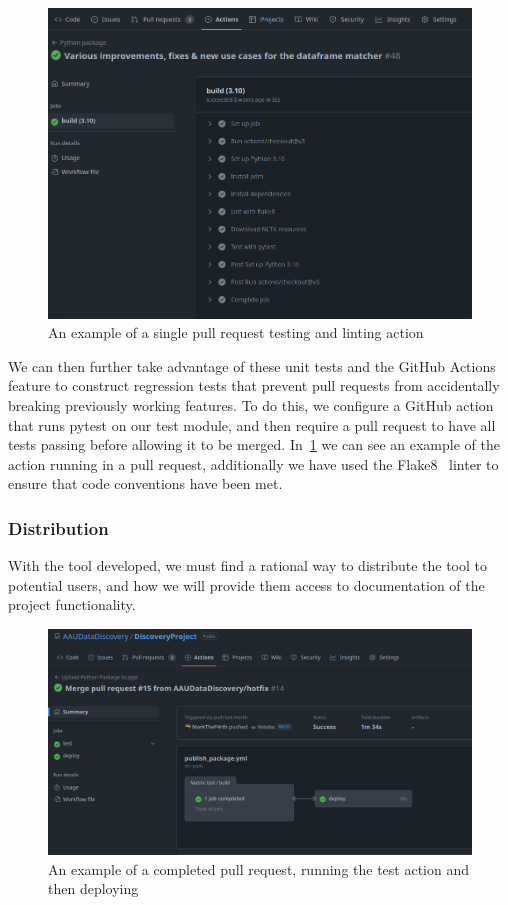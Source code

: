 \begin{figure}[H]
    \centering
    \includegraphics[width=12cm]{figures/discovery_library/test_and_lint_github_action}
    \caption{An example of a single pull request testing and linting action}
    \label{fig:discovery_unit_test}
\end{figure}

We can then further take advantage of these unit tests and the GitHub Actions feature to construct regression tests
that prevent pull requests from accidentally breaking previously working features.
To do this, we configure a GitHub action that runs pytest on our test module, and then require a pull request to have
all tests passing before allowing it to be merged.
In~\ref{fig:discovery_unit_test} we can see an example of the action running in a pull request, additionally we have
used the Flake8~\cite{Flake8} linter to ensure that code conventions have been met.

\subsubsection{Distribution}
With the tool developed, we must find a rational way to distribute the tool to potential users, and how we will provide
them access to documentation of the project functionality.

\begin{figure}[H]
    \centering
    \includegraphics[width=12cm]{figures/discovery_library/github_action_test_and_deploy}
    \caption{An example of a completed pull request, running the test action and then deploying}
    \label{fig:discovery_test_and_deploy}
\end{figure}

